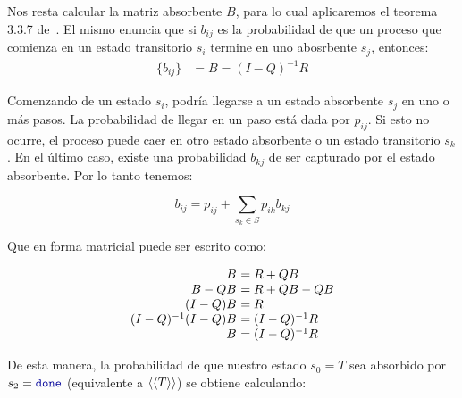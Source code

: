 Nos resta calcular la matriz absorbente $B$, para lo cual aplicaremos el
teorema 3.3.7 de~\cite{KemenySnell}. El mismo
enuncia que si $b_{ij}$ es la probabilidad de que un proceso que comienza en un
estado transitorio $s_i$ termine en uno abosrbente $s_j$, entonces:
\begin{align*}
	\{b_{ij}\} & = B = (I - Q)^{-1}R
\end{align*}

Comenzando de un estado $s_i$, podría llegarse a un estado absorbente $s_j$ en
uno o más pasos. La probabilidad de llegar en un paso está dada por $p_{ij}$.
Si esto no ocurre, el proceso puede caer en otro estado absorbente o un estado
transitorio $s_k$. En el último caso, existe una probabilidad $b_{kj}$ de ser
capturado por el estado absorbente. Por lo tanto tenemos:

\begin{equation*}
	b_{ij} = p_{ij} + \sum_{s_k \in S} p_{ik} b_{kj}
\end{equation*}

Que en forma matricial puede ser escrito como:

\[
\begin{array}{r@{\ }l}
	B & = R + QB \\
	B - QB & = R + QB -QB \\
	(I - Q)B & = R \\
	(I - Q)^{-1}(I - Q)B & = (I - Q)^{-1}R \\
	B & = (I - Q)^{-1}R
\end{array}
\]

De esta manera, la probabilidad de que nuestro estado $s_0 = T$ sea absorbido por
$s_2 = \Done$ (equivalente a $\langle\langle T\rangle\rangle$) se obtiene calculando:

